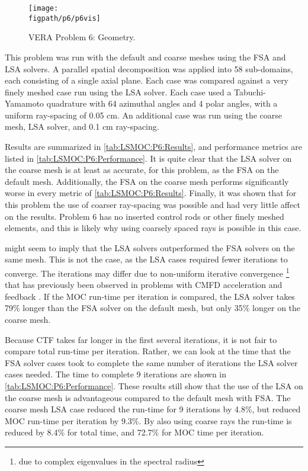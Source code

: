{{{      \begin{figure}[h]
        \centering
        \texttt{[image: \\figpath/p6/p6vis]}
        \caption{VERA Problem 6: Geometry.\label{fig:LSMOC:P6:Problem}}
      \end{figure}

      This problem was run with the default and coarse meshes using the \ac{FSA} and \ac{LSA} solvers.
      A parallel spatial decomposition was applied into 58 sub-domains, each consisting of a single axial plane.
      Each case was compared against a very finely meshed case run using the \ac{LSA} solver.
      Each case used a Tabuchi-Yamamoto quadrature with 64 azimuthal angles and 4 polar angles, with a uniform ray-spacing of 0.05 cm.
      An additional case was run using the coarse mesh, \ac{LSA} solver, and 0.1 cm ray-spacing.

      Results are summarized in \cref{tab:LSMOC:P6:Results}, and performance metrics are listed in \cref{tab:LSMOC:P6:Performance}.
      It is quite clear that the \ac{LSA} solver on the coarse mesh is at least as accurate, for this problem, as the \ac{FSA} on the default mesh.
      Additionally, the \ac{FSA} on the coarse mesh performs significantly worse in every metric of \cref{tab:LSMOC:P6:Results}.
      Finally, it was shown that for this problem the use of coarser ray-spacing was possible and had very little affect on the results.
      Problem 6 has no inserted control rods or other finely meshed elements, and this is likely why using coarsely spaced rays is possible in this case.

       might seem to imply that the \ac{LSA} solvers outperformed the \ac{FSA} solvers on the same mesh.
      This is not the case, as the \ac{LSA} cases required fewer iterations to converge.
      The iterations may differ due to non-uniform iterative convergence \footnote{due to complex eigenvalues in the spectral radius} that has previously been observed in problems with \ac{CMFD} acceleration and feedback \cite{Kochunas2017}.
      If the \ac{MOC} run-time per iteration is compared, the \ac{LSA} solver takes 79\% longer than the \ac{FSA} solver on the default mesh, but only 35\% longer on the coarse mesh.

      Because \ac{CTF} takes far longer in the first several iterations, it is not fair to compare total run-time per iteration.
      Rather, we can look at the time that the \ac{FSA} solver cases took to complete the same number of iterations the \ac{LSA} solver cases needed.
      The time to complete 9 iterations are shown in \cref{tab:LSMOC:P6:Performance}.
      These results still show that the use of the \ac{LSA} on the coarse mesh is advantageous compared to the default mesh with \ac{FSA}.
      The coarse mesh \ac{LSA} case reduced the run-time for 9 iterations by 4.8\%, but reduced \ac{MOC} run-time per iteration by 9.3\%.
      By also using coarse rays the run-time is reduced by 8.4\% for total time, and 72.7\% for \ac{MOC} time per iteration.

}}}
